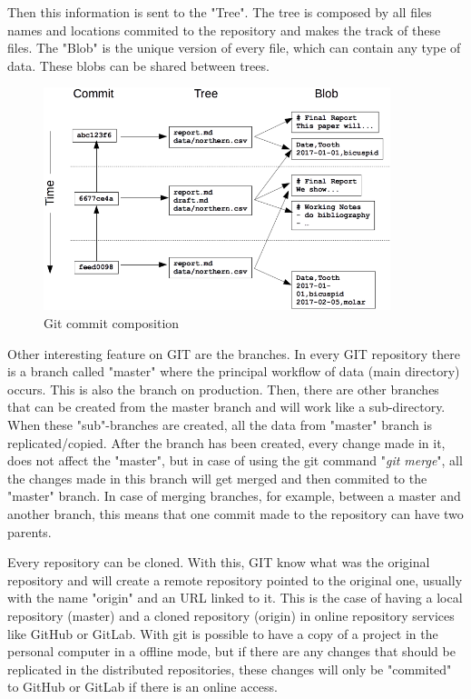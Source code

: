 \documentclass[mim_thesis.tex]{subfiles}
\begin{document}
Then this information is sent to the "Tree". The tree is composed by all files names and locations commited to the repository and makes the track of these files. The "Blob" is the unique version of every file, which can contain any type of data. These blobs can be shared between trees.

\begin{figure}[H]
	\centering
    \includegraphics[width=0.9\textwidth]{img/git_commit_areas.PNG}
	\caption{Git commit composition \citep{datacamp2017}}
	\label{fig:git_commit_areas}
\end{figure}

Other interesting feature on GIT are the branches. In every GIT repository there is a branch called "master" where the principal workflow of data (main directory) occurs. This is also the branch on production. Then, there are other branches that can be created from the master branch and will work like a sub-directory. When these "sub"-branches are created, all the data from "master" branch is replicated/copied. After the branch has been created, every change made in it, does not affect the "master", but in case of using the git command "\textit{git merge}", all the changes made in this branch will get merged and then commited to the "master" branch. In case of merging branches, for example, between a master and another branch, this means that one commit made to the repository can have two parents. 

Every repository can be cloned. With this, GIT know what was the original repository and will create a remote repository pointed to the original one, usually with the name "origin" and an \ac{URL} linked to it. This is the case of having a local repository (master) and a cloned repository (origin) in online repository services like GitHub or GitLab. With git is possible to have a copy of a project in the personal computer in a offline mode, but if there are any changes that should be replicated in the distributed repositories, these changes will only be "commited" to GitHub or GitLab if there is an online access.   
\end{document}
